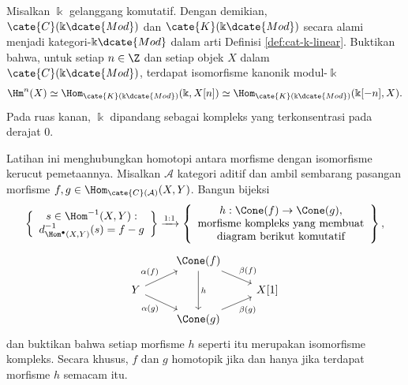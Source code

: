 
\hypertarget{o014.aljabr2.chapter3.exercises}{ }
\begin{Exercises}
	\item Misalkan $\Bbbk$ gelanggang komutatif. Dengan demikian,
	$\cate{C}(\Bbbk\dcate{Mod})$ dan $\cate{K}(\Bbbk\dcate{Mod})$ secara alami
	menjadi kategori-$\Bbbk\dcate{Mod}$ dalam arti Definisi
	\ref{def:cat-k-linear}. Buktikan bahwa, untuk setiap $n\in\Z$ dan setiap
	objek $X$ dalam $\cate{C}(\Bbbk\dcate{Mod})$, terdapat isomorfisme kanonik
	modul-$\Bbbk$
	\[
		\Hm^n(X) \simeq
		\Hom_{\cate{K}(\Bbbk\dcate{Mod})}(\Bbbk,X[n])
		\simeq
		\Hom_{\cate{K}(\Bbbk\dcate{Mod})}(\Bbbk[-n],X).
	\]
	Pada ruas kanan, $\Bbbk$ dipandang sebagai kompleks yang terkonsentrasi
	pada derajat $0$.

	\item Latihan ini menghubungkan homotopi antara morfisme dengan
	isomorfisme kerucut pemetaannya. Misalkan $\mathcal{A}$ kategori aditif dan
	ambil sembarang pasangan morfisme
	$f,g\in\Hom_{\cate{C}(\mathcal{A})}(X,Y)$. Bangun bijeksi
	\[
	\left\{
	\begin{array}{c}
		s\in\Hom^{-1}(X,Y): \\
		d^{-1}_{\Hom^\bullet(X,Y)}(s)=f-g
	\end{array}
	\right\}
	\xrightarrow{1:1}
	\left\{
	\begin{array}{c}
		h:\Cone(f)\to\Cone(g),\\
		\text{morfisme kompleks yang membuat}\\
		\text{diagram berikut komutatif}
	\end{array}
	\right\},
	\]
	\begin{equation*}
	\begin{tikzcd}[row sep=small]
		& \Cone(f) \arrow[dr, "\beta(f)"] \arrow[dd, "h"] & \\
		Y \arrow[ru, "\alpha(f)"] \arrow[rd, "\alpha(g)"'] & & X[1] \\
		& \Cone(g) \arrow[ru, "\beta(g)"'] &
	\end{tikzcd}
	\end{equation*}
	dan buktikan bahwa setiap morfisme $h$ seperti itu merupakan isomorfisme
	kompleks. Secara khusus, $f$ dan $g$ homotopik jika dan hanya jika terdapat
	morfisme $h$ semacam itu.


\end{Exercises}
